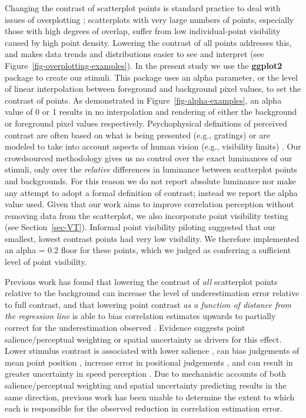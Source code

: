 \documentclass[manuscript, review, anonymous, screen]{acmart}
\begin{document}
Changing the contrast of scatterplot points is standard practice to deal
with issues of overplotting \citep{matejka_2015, bertini_2004};
scatterplots with very large numbers of points, especially those with high
degrees of overlap, suffer from low individual-point visibility caused
by high point density. Lowering the contrast of all points addresses
this, and makes data trends and distributions easier to see and
interpret (see Figure~\ref{fig-overplotting-examples}). In the present
study we use the \textbf{ggplot2} package \citep{hadley_gg2016} to
create our stimuli. This package uses an alpha parameter, or the level
of linear interpolation \citep{stone_2008} between foreground and
background pixel values, to set the contrast of points. As demonstrated
in Figure~\ref{fig-alpha-examples}, an alpha value of 0 or 1 results in
no interpolation and rendering of either the background or foreground
pixel values respectively. Psychophysical definitions of perceived
contrast are often based on what is being presented (e.g., gratings) or
are modeled to take into account aspects of human vision (e.g.,
visibility limits) \citep{zuffi_2007}. Our crowdsourced methodology
gives us no control over the exact luminances of our stimuli, only over
the \emph{relative} differences in luminance between scatterplot points
and backgrounds. For this reason we do not report absolute luminance nor
make any attempt to adopt a formal definition of contrast; instead we
report the alpha value used. Given that our work aims to improve
correlation perception without removing data from the scatterplot, we
also incorporate point visibility testing (see Section~\ref{sec-VT}).
Informal point visibility piloting suggested that our smallest, lowest
contrast points had very low visibility. We therefore implemented an
alpha = 0.2 floor for these points, which we judged as conferring a
sufficient level of point visibility.

Previous work has found that lowering the contrast of \emph{all}
scatterplot points relative to the background can increase the level of
underestimation error relative to full contrast, and that lowering point
contrast \emph{as a function of distance from the regression line} is
able to bias correlation estimates upwards to partially correct for the
underestimation observed \citep{strain_2023}. Evidence suggests point
salience/perceptual weighting or spatial uncertainty as drivers for this
effect. Lower stimulus contrast is associated with lower salience
\citep{healey_2011}, can bias judgements of mean point position
\citep{hong_2021}, increase error in positional judgements
\citep{wehrhahn_1990}, and can result in greater uncertainty in speed
perception \citep{champion_2017}. Due to mechanistic accounts of both
salience/perceptual weighting and spatial uncertainty predicting results
in the same direction, previous work \citep{strain_2023} has been unable
to determine the extent to which each is responsible for the observed
reduction in correlation estimation error.
\end{document}
